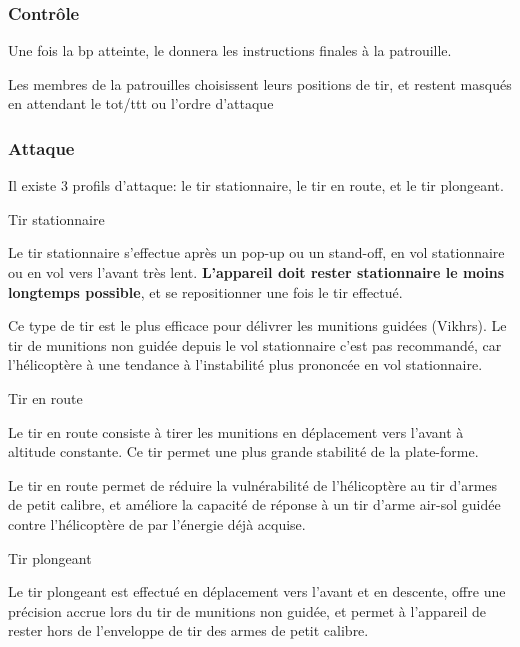 \subsubsection{Contrôle}

\e
    \item Une fois la \gls{bp} atteinte, le \ja{} donnera les instructions finales à la patrouille.
    \item Les membres de la patrouilles choisissent leurs positions de tir, et restent masqués en attendant le \gls{tot}/\gls{ttt} ou l'ordre d'attaque
\ed

\subsubsection{Attaque}

\e
    \item Il existe 3 profils d'attaque: le tir stationnaire, le tir en route, et le tir plongeant.

	\item Tir stationnaire

	\ee
	    \item
	    Le tir stationnaire s'effectue après un pop-up ou un stand-off, en vol stationnaire ou en vol vers l'avant très lent. \textbf{L'appareil doit rester stationnaire le moins longtemps possible}, et se repositionner une fois le tir effectué.
	    \item
	    Ce type de tir est le plus efficace pour délivrer les munitions guidées (Vikhrs). Le tir de munitions non guidée depuis le vol stationnaire c'est pas recommandé, car l'hélicoptère à une tendance à l'instabilité plus prononcée en vol stationnaire.
	\ed

	\item Tir en route

	\ee
	    \item Le tir en route consiste à tirer les munitions en déplacement vers l'avant à altitude constante. Ce tir permet une plus grande stabilité de la plate-forme.
	    \item
	    Le tir en route permet de réduire la vulnérabilité de l'hélicoptère au tir d'armes de petit calibre, et améliore la capacité de réponse à un tir d'arme air-sol guidée contre l'hélicoptère de par l'énergie déjà acquise.
	\ed

	\item Tir plongeant

	\ee
	    \item
	    Le tir plongeant est effectué en déplacement vers l'avant et en descente, offre une précision accrue lors du tir de munitions non guidée, et permet à l'appareil de rester hors de l'enveloppe de tir des armes de petit calibre.
	
